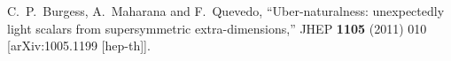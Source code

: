 \documentclass[11pt,a4paper]{article}
\begin{document}
\begin{thebibliography}{99}
  C.~P.~Burgess, A.~Maharana and F.~Quevedo,
  ``Uber-naturalness: unexpectedly light scalars from supersymmetric extra-dimensions,''
  JHEP {\bf 1105} (2011) 010
  [arXiv:1005.1199 [hep-th]].
   
\end{thebibliography}    
\end{document}
